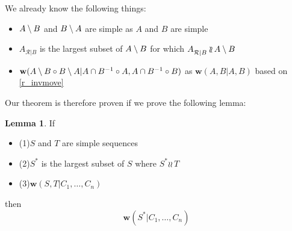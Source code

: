 \documentclass[12pt]{article}
\newcommand{\cc}{\circ} %
\newcommand{\indep}{\wr\!\!\wr\,} %
\newcommand{\worksc}[2]{{\mathbf{w}}({#1}|{#2})}
\newcommand{\ordered}[1]{#1}
\newcommand{\recchar}[3]{{#1}^{#3}_{\mathcal{R}|{#2}}}
\newcommand{\reca}{\recchar{A}{B}{}} %
\theoremstyle{definition}
\newtheorem{mylem}{Lemma}
\begin{document}
We already know the following things:
\begin{itemize}
\item $A\setminus B$ and $B\setminus A$ are simple as $A$ and $B$ are simple
\item $\reca$ is the largest subset of $A\setminus B$ for which $\reca\indep\amb$
\item $\worksc{\ordered{\amb}\cc \ordered{\bma}}{\acbi\cc A,\acbi\cc B}$ as $\worksc{A,B}{A,B}$ based on \cref{r_invmove}
\end{itemize}

Our theorem is therefore proven if we prove the following lemma:

\begin{mylem}
If
   \begin{itemize}
   \item \newcommand{\condSimple}{(1)} \condSimple $S$ and $T$ are simple sequences
   \item \newcommand{\condApr}{(2)} \condApr $S^*$ is the largest subset of $S$ where $S^*\indep T$
   \item \newcommand{\condWork}{(3)} \condWork $\worksc{S,T}{C_1,\ldots,C_n}$
   \end{itemize}
then
\[ \worksc{S^*}{C_1,\ldots,C_n} \]
\end{mylem}
\end{document}
